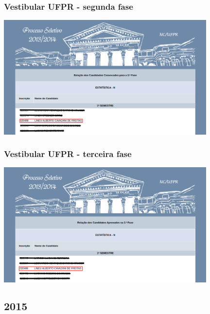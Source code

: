 \documentclass[10pt,
  aspectratio=169,
  serif,
  mathserif,
  professionalfont,
  compress,
  handout,
  ]{beamer}\usepackage[]{graphicx}\usepackage[]{color}
\begin{document}

\begin{frame}

\frametitle{Vestibular UFPR - segunda fase}

\begin{center}
  \includegraphics[width=11cm]{img/fase2.png}
\end{center}

\end{frame}


\begin{frame}

\frametitle{Vestibular UFPR - terceira fase}

\begin{center}
  \includegraphics[width=11cm]{img/fase3.png}
\end{center}

\end{frame}


\subsection{2015}
\end{document}

